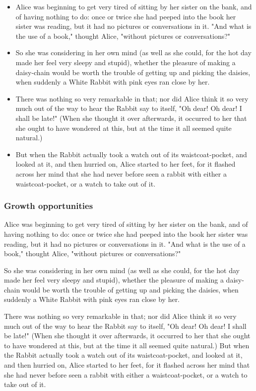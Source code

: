 \documentclass[12pt]{article}
\begin{document}
\begin{itemize}
\item Alice was beginning to get very tired of sitting by her sister on the bank, and of having nothing to do: once or twice she had peeped into the book her sister was reading, but it had no pictures or conversations in it. "And what is the use of a book," thought Alice, "without pictures or conversations?"
\item So she was considering in her own mind (as well as she could, for the hot day made her feel very sleepy and stupid), whether the pleasure of making a daisy-chain would be worth the trouble of getting up and picking the daisies, when suddenly a White Rabbit with pink eyes ran close by her.
\item There was nothing so very remarkable in that; nor did Alice think it so very much out of the way to hear the Rabbit say to itself, "Oh dear! Oh dear! I shall be late!" (When she thought it over afterwards, it occurred to her that she ought to have wondered at this, but at the time it all seemed quite natural.)
\item But when the Rabbit actually took a watch out of its waistcoat-pocket, and looked at it, and then hurried on, Alice started to her feet, for it flashed across her mind that she had never before seen a rabbit with either a waistcoat-pocket, or a watch to take out of it.
\end{itemize}

\subsubsection{Growth opportunities}
\label{sec:orgheadline38}
Alice was beginning to get very tired of sitting by her sister on the bank, and of having nothing to do: once or twice she had peeped into the book her sister was reading, but it had no pictures or conversations in it. "And what is the use of a book," thought Alice, "without pictures or conversations?" 

So she was considering in her own mind (as well as she could, for the hot day made her feel very sleepy and stupid), whether the pleasure of making a daisy-chain would be worth the trouble of getting up and picking the daisies, when suddenly a White Rabbit with pink eyes ran close by her.

There was nothing so very remarkable in that; nor did Alice think it so very much out of the way to hear the Rabbit say to itself, "Oh dear! Oh dear! I shall be late!" (When she thought it over afterwards, it occurred to her that she ought to have wondered at this, but at the time it all seemed quite natural.) But when the Rabbit actually took a watch out of its waistcoat-pocket, and looked at it, and then hurried on, Alice started to her feet, for it flashed across her mind that she had never before seen a rabbit with either a waistcoat-pocket, or a watch to take out of it. 
\end{document}
